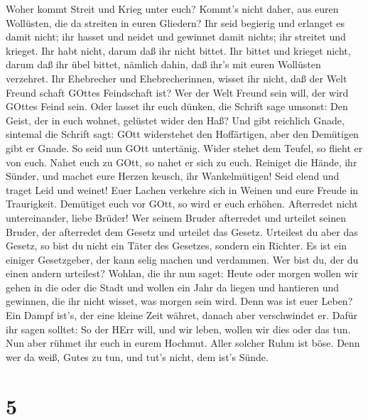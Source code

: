  Woher kommt Streit und Krieg unter euch? Kommt's nicht
daher, aus euren Wollüsten, die da streiten in euren Gliedern?
 Ihr seid begierig und erlanget es damit nicht; ihr hasset
und neidet und gewinnet damit nichts; ihr streitet und krieget. Ihr habt
nicht, darum daß ihr nicht bittet.  Ihr bittet und krieget
nicht, darum daß ihr übel bittet, nämlich dahin, daß ihr's mit euren
Wollüsten verzehret.  Ihr Ehebrecher und Ehebrecherinnen,
wisset ihr nicht, daß der Welt Freund schaft GOttes Feindschaft ist? Wer
der Welt Freund sein will, der wird GOttes Feind sein.  Oder
lasset ihr euch dünken, die Schrift sage umsonst: Den Geist, der in euch
wohnet, gelüstet wider den Haß?  Und gibt reichlich Gnade,
sintemal die Schrift sagt: GOtt widerstehet den Hoffärtigen, aber den
Demütigen gibt er Gnade.  So seid nun GOtt untertänig. Wider
stehet dem Teufel, so flieht er von euch.  Nahet euch zu
GOtt, so nahet er sich zu euch. Reiniget die Hände, ihr Sünder, und
machet eure Herzen keusch, ihr Wankelmütigen!  Seid elend
und traget Leid und weinet! Euer Lachen verkehre sich in Weinen und eure
Freude in Traurigkeit.  Demütiget euch vor GOtt, so wird er
euch erhöhen.  Afterredet nicht untereinander, liebe
Brüder! Wer seinem Bruder afterredet und urteilet seinen Bruder, der
afterredet dem Gesetz und urteilet das Gesetz. Urteilest du aber das
Gesetz, so bist du nicht ein Täter des Gesetzes, sondern ein Richter.
 Es ist ein einiger Gesetzgeber, der kann selig machen und
verdammen. Wer bist du, der du einen andern urteilest? 
Wohlan, die ihr nun saget: Heute oder morgen wollen wir gehen in die
oder die Stadt und wollen ein Jahr da liegen und hantieren und gewinnen,
 die ihr nicht wisset, was morgen sein wird. Denn was ist
euer Leben? Ein Dampf ist's, der eine kleine Zeit währet, danach aber
verschwindet er.  Dafür ihr sagen solltet: So der HErr
will, und wir leben, wollen wir dies oder das tun.  Nun
aber rühmet ihr euch in eurem Hochmut. Aller solcher Ruhm ist böse.
 Denn wer da weiß, Gutes zu tun, und tut's nicht, dem ist's
Sünde.

\hypertarget{section-4}{%
\section{5}\label{section-4}}


